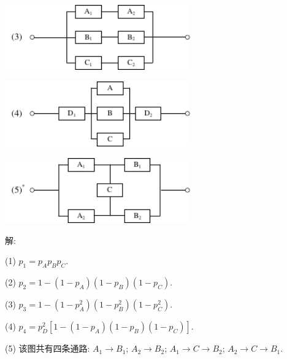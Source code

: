 \documentclass[standard]{ExBook}
\begin{document}
\begin{qitems}
\begin{bbox}
\begin{shaded}
\vspace{1em}

\begin{minipage}{8cm}
    \centering
    \includegraphics[width=8cm]{img/1.39_3.pdf}
\end{minipage}

\vspace{1em}

\begin{minipage}{8cm}
    \centering
    \includegraphics[width=8cm]{img/1.39_4.pdf}
\end{minipage}

\vspace{1em}

\begin{minipage}{8cm}
    \centering
    \includegraphics[width=8cm]{img/1.39_5.pdf}
\end{minipage}
    \end{shaded}
    \end{bbox}

\vspace{-5em}

    \begin{bbox}
解: 

(1) $p_{1}=p_{A}p_{B}p_{C}$.

(2) $p_{2}=1-(1-p_{A})(1-p_{B})(1-p_{C})$.

(3) $p_{3}=1-(1-p_{A}^2)(1-p_{B}^2)(1-p_{C}^2)$.

(4) $p_{4}=p_{D}^2[1-(1-p_{A})(1-p_{B})(1-p_{C})]$.

(5) 该图共有四条通路: $A_{1}\longrightarrow B_{1}$; $A_{2}\longrightarrow B_{2}$; $A_{1}\longrightarrow C\longrightarrow B_{2}$; $A_{2}\longrightarrow C\longrightarrow B_{1}$. 


\end{bbox}
\end{qitems}
\end{document}
